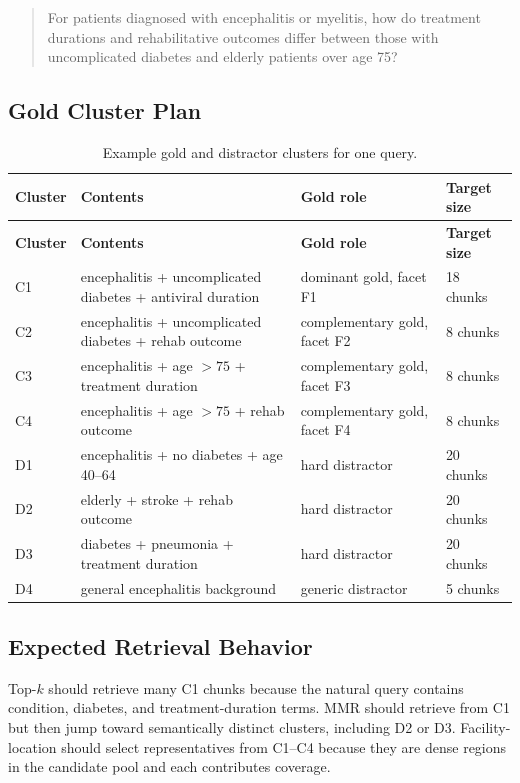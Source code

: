 \documentclass[11pt,a4paper]{article}
\begin{document}
\begin{quote}
	For patients diagnosed with encephalitis or myelitis, how do treatment durations and rehabilitative outcomes differ between those with uncomplicated diabetes and elderly patients over age 75?
\end{quote}

\subsection{Gold Cluster Plan}

\begin{longtable}{p{2.6cm}p{4.2cm}p{4.1cm}p{3.5cm}}
	\caption{Example gold and distractor clusters for one query.}\\
	\toprule
	\textbf{Cluster} & \textbf{Contents} & \textbf{Gold role} & \textbf{Target size}\\
	\midrule
	\endfirsthead
	\toprule
	\textbf{Cluster} & \textbf{Contents} & \textbf{Gold role} & \textbf{Target size}\\
	\midrule
	\endhead
	\bottomrule
	\endfoot
	C1 & encephalitis + uncomplicated diabetes + antiviral duration & dominant gold, facet F1 & 18 chunks\\
	C2 & encephalitis + uncomplicated diabetes + rehab outcome & complementary gold, facet F2 & 8 chunks\\
	C3 & encephalitis + age $>75$ + treatment duration & complementary gold, facet F3 & 8 chunks\\
	C4 & encephalitis + age $>75$ + rehab outcome & complementary gold, facet F4 & 8 chunks\\
	D1 & encephalitis + no diabetes + age 40--64 & hard distractor & 20 chunks\\
	D2 & elderly + stroke + rehab outcome & hard distractor & 20 chunks\\
	D3 & diabetes + pneumonia + treatment duration & hard distractor & 20 chunks\\
	D4 & general encephalitis background & generic distractor & 5 chunks\\
\end{longtable}

\subsection{Expected Retrieval Behavior}

Top-$k$ should retrieve many C1 chunks because the natural query contains condition, diabetes, and treatment-duration terms. MMR should retrieve from C1 but then jump toward semantically distinct clusters, including D2 or D3. Facility-location should select representatives from C1--C4 because they are dense regions in the candidate pool and each contributes coverage.
\end{document}
